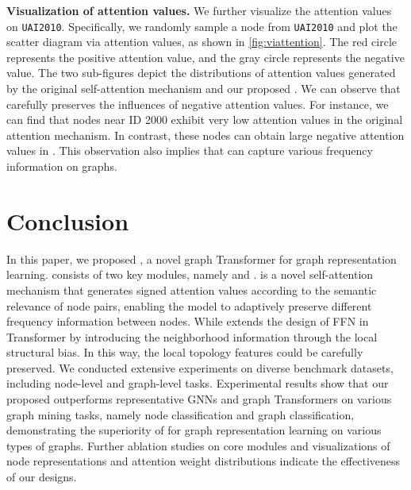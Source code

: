 \documentclass[sigconf, screen]{acmart}
\begin{document}
\textbf{Visualization of attention values.}
We further visualize the attention values on \texttt{UAI2010}.
Specifically, we randomly sample a node from \texttt{UAI2010} and plot the scatter diagram via attention values, as shown in \autoref{fig:viattention}.
The red circle represents the positive attention value, and the gray circle represents the negative value.
The two sub-figures depict the distributions of attention values generated by the original self-attention mechanism and our proposed \saname.
We can observe that \saname carefully preserves the influences of negative attention values.
For instance, we can find that nodes near ID 2000 exhibit very low attention values in the original attention mechanism.
In contrast, these nodes can obtain large negative attention values in \saname.
This observation also implies that \saname can capture various frequency information on graphs. 




























 
\section{Conclusion}
In this paper, we proposed \name, a novel graph Transformer for graph representation learning.
\name consists of two key modules, namely \saname and \sffn. 
\saname is a novel self-attention mechanism that generates signed attention values according to the semantic relevance of node pairs, enabling the model to adaptively preserve different frequency information between nodes.
While \sffn extends the design of FFN in Transformer by introducing the neighborhood information through the local structural bias. In this way, the local topology features could be carefully preserved.
We conducted extensive experiments on diverse benchmark datasets, including node-level and graph-level tasks.
Experimental results show that our proposed \name outperforms representative GNNs and graph Transformers on various graph mining tasks, namely node classification and graph classification, demonstrating the superiority of \name for graph representation learning on various types of graphs. 
Further ablation studies on core modules and visualizations of node representations and attention weight distributions indicate the effectiveness of our designs.
\end{document}
